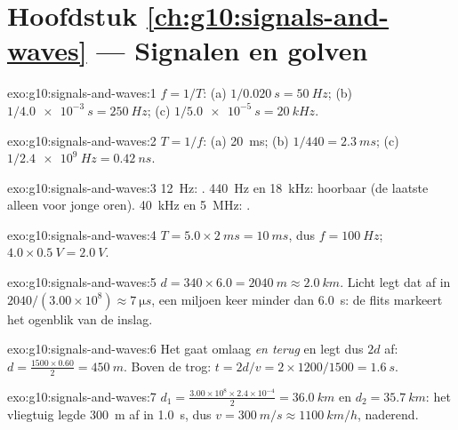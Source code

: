\section*{Hoofdstuk \ref{ch:g10:signals-and-waves} --- Signalen en golven}

\begin{solution}{exo:g10:signals-and-waves:1}
$f = 1/T$: (a) $1/\qty{0.020}{s} = \qty{50}{Hz}$;
(b) $1/\qty{4.0e-3}{s} = \qty{250}{Hz}$;
(c) $1/\qty{5.0e-5}{s} = \qty{20}{kHz}$.
\end{solution}

\begin{solution}{exo:g10:signals-and-waves:2}
$T = 1/f$: (a) \qty{20}{ms}; (b) $1/440 = \qty{2.3}{ms}$;
(c) $1/\qty{2.4e9}{Hz} = \qty{0.42}{ns}$.
\end{solution}

\begin{solution}{exo:g10:signals-and-waves:3}
\qty{12}{Hz}: . \qty{440}{Hz} en \qty{18}{kHz}: hoorbaar (de
laatste alleen voor jonge oren). \qty{40}{kHz} en \qty{5}{MHz}:
.
\end{solution}

\begin{solution}{exo:g10:signals-and-waves:4}
$T = 5.0 \times \qty{2}{ms} = \qty{10}{ms}$, dus $f = \qty{100}{Hz}$;
 $4.0 \times \qty{0.5}{V} = \qty{2.0}{V}$.
\end{solution}

\begin{solution}{exo:g10:signals-and-waves:5}
$d = 340 \times 6.0 = \qty{2040}{m} \approx \qty{2.0}{km}$. Licht legt
dat af in $2040/(3.00\times10^{8}) \approx \qty{7}{\micro s}$, een
miljoen keer minder dan \qty{6.0}{s}: de flits markeert het ogenblik van
de inslag.
\end{solution}

\begin{solution}{exo:g10:signals-and-waves:6}
Het  gaat omlaag \emph{en terug} en legt dus $2d$ af:
$d = \frac{1500 \times 0.60}{2} = \qty{450}{m}$. Boven de trog:
$t = 2d/v = 2 \times 1200/1500 = \qty{1.6}{s}$.
\end{solution}

\begin{solution}{exo:g10:signals-and-waves:7}
$d_1 = \frac{3.00\times10^{8} \times 2.4\times10^{-4}}{2} =
\qty{36.0}{km}$ en $d_2 = \qty{35.7}{km}$: het vliegtuig legde
\qty{300}{m} af in \qty{1.0}{s}, dus $v = \qty{300}{m/s} \approx
\qty{1100}{km/h}$, naderend.
\end{solution}

